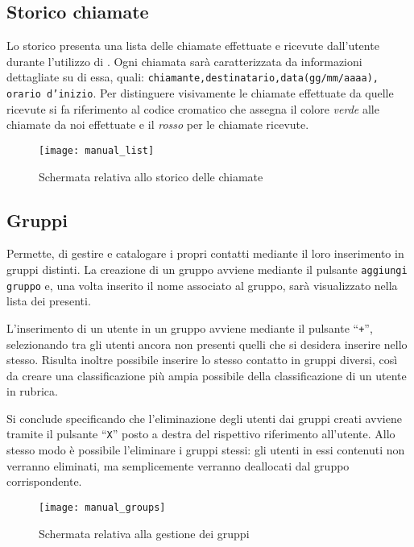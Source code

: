 \clearpage
\subsection{Storico chiamate}
Lo storico presenta una lista delle chiamate effettuate e ricevute dall'utente durante l'utilizzo di \caName{}. Ogni chiamata sarà caratterizzata da informazioni dettagliate su di essa, quali: \texttt{chiamante,destinatario,data(gg/mm/aaaa), orario d'inizio}.
Per distinguere visivamente le chiamate effettuate da quelle ricevute si fa riferimento al codice cromatico che assegna il colore \textit{verde} alle chiamate da noi effettuate e il \textit{rosso} per le chiamate ricevute. 

\begin{figure}[H]
  \centering
  \texttt{[image: manual\_list]}
\caption{Schermata relativa allo storico delle chiamate}\label{fig:manual_list}
\end{figure}

\clearpage
\subsection{Gruppi}
Permette, di gestire e catalogare i propri contatti mediante il loro inserimento in gruppi distinti.
La creazione di un gruppo avviene mediante il pulsante \texttt{aggiungi gruppo} e, una volta inserito il nome associato al gruppo, sarà visualizzato nella lista dei presenti.

L'inserimento di un utente in un gruppo avviene mediante il pulsante ``\texttt{+}'', selezionando tra gli utenti ancora non presenti quelli che si desidera inserire nello stesso.
Risulta inoltre possibile inserire lo stesso contatto in gruppi diversi, così da creare una classificazione più ampia possibile della classificazione di un utente in rubrica.

Si conclude specificando che l'eliminazione degli utenti dai gruppi creati avviene tramite il pulsante ``\texttt{X}'' posto a destra del rispettivo riferimento all'utente. Allo stesso modo è possibile l'eliminare i gruppi stessi: gli utenti in essi contenuti non verranno eliminati, ma semplicemente verranno deallocati dal gruppo corrispondente.

\begin{figure}[H]
  \centering
  \texttt{[image: manual\_groups]}
\caption{Schermata relativa alla gestione dei gruppi}\label{fig:manual_groups}
\end{figure}

